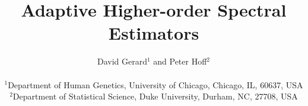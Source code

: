 \documentclass[11pt,authoryear]{article}
\begin{document}
\singlespacing
\title{Adaptive Higher-order Spectral Estimators}
\author{David Gerard$^1$ and Peter Hoff$^{2}$ \\
\\
$^1$Department of Human Genetics,
University of Chicago, Chicago, IL, 60637, USA\\
$^2$Department of Statistical Science,
Duke University, Durham, NC, 27708, USA}
\maketitle
\let\thefootnote\relax{}









\appendix



\end{document}
